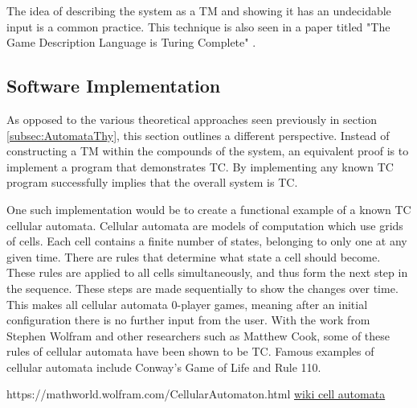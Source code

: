 The idea of describing the system as a TM and showing it has an undecidable input is a common practice.
This technique is also seen in a paper titled "The Game Description Language is Turing Complete" \cite{GDLTC}.

\subsection{Software Implementation}\label{subsec:SoftwareImplementation}

As opposed to the various theoretical approaches seen previously in section \ref{subsec:AutomataThy}, this section outlines a different perspective.
Instead of constructing a TM within the compounds of the system, an equivalent proof is to implement a program that demonstrates TC.
By implementing any known TC program successfully implies that the overall system is TC.

One such implementation would be to create a functional example of a known TC cellular automata.
Cellular automata are models of computation which use grids of cells.
Each cell contains a finite number of states, belonging to only one at any given time.
There are rules that determine what state a cell should become.
These rules are applied to all cells simultaneously, and thus form the next step in the sequence.
These steps are made sequentially to show the changes over time.
This makes all cellular automata 0-player games, meaning after an initial configuration there is no further input from the user.
With the work from Stephen Wolfram and other researchers such as Matthew Cook, some of these rules of cellular automata have been shown to be TC.
Famous examples of cellular automata include Conway's Game of Life and Rule 110.

https://mathworld.wolfram.com/CellularAutomaton.html
\href{https://en.wikipedia.org/wiki/Cellular_automaton}{wiki cell automata} 


